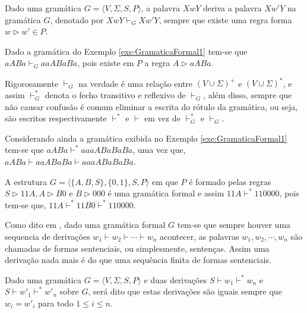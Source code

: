 \begin{definition}
	Dado uma gramática $G = \langle V, \Sigma, S, P \rangle$, a palavra $XwY$ deriva a palavra $Xw'Y$  na gramática $G$, denotado por $XwY \vdash_G Xw'Y$, sempre que existe uma regra forma $w \rhd w' \in P$.
\end{definition}

\begin{example}
	Dado a gramática do Exemplo \ref{exe:GramaticaFormal1} tem-se que $aABa \vdash_G aaABaBa$, pois existe em $P$ a regra $A \rhd aABa$.
\end{example}

Rigorosamente $\vdash_G$ na verdade é uma relação entre $(V \cup \Sigma)^+$ e $(V \cup \Sigma)^*$, e assim $\vdash_G^*$ denota o fecho transitivo e reflexivo de  $\vdash_G$, além disso, sempre que não causar confusão é comum eliminar a escrita do rótulo da gramática, ou seja, são escritos respectivamente $\vdash^*$ e $\vdash$ em vez de $\vdash_G^*$ e $\vdash_G$.

\begin{example}
	Considerando ainda a gramática exibida no Exemplo \ref{exe:GramaticaFormal1} tem-se que $aABa \vdash^* aaaABaBaBa$, uma vez que, $aABa \vdash aaABaBa \vdash aaaABaBaBa$.
\end{example}

\begin{example}
	A estrutura $G = \langle \{A, B, S\}, \{0,1\}, S, P \rangle$ em que $P$ é formado pelas regras $S \rhd 11A, A \rhd B0$ e $B \rhd 000$ é uma gramática formal e assim $11A \vdash^* 110000$, pois tem-se que, $11A \vdash^* 11B0 \vdash^* 110000$.
\end{example}

Como dito em \cite{benjaLivro2010}, dado uma gramática formal $G$ tem-se que sempre houver uma sequencia de derivações $w_1 \vdash w_2 \vdash \cdots \vdash w_n$ acontecer, as palavras $w_1, w_2, \cdots, w_n$ são chamadas de formas sentenciais, ou simplesmente, sentenças. Assim uma derivação nada mais é do que uma sequência finita de formas sentenciais.

\begin{definition}\label{def:IgualdadeDerivacaoGramatica}
	Dado uma gramática $G = \langle V, \Sigma, S, P \rangle$ e duas derivações $S \vdash w_1 \vdash^* w_n$ e $S \vdash w'_1 \vdash^* w'_n$ sobre $G$, será dito que estas derivações são iguais sempre que $w_i = w'_i$ para todo $1 \leq i \leq n$.
\end{definition}

